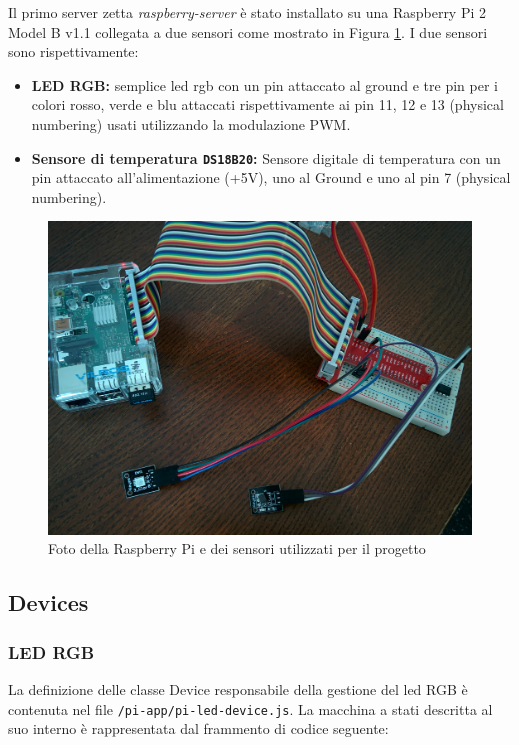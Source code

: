 \documentclass[]{scrartcl}
\begin{document}
Il primo server zetta \textit{raspberry-server} è stato installato su una Raspberry Pi 2 Model B v1.1 collegata a due sensori come mostrato in Figura \ref{fig:circuit}. I due sensori sono rispettivamente:
\begin{itemize}
\item \textbf{LED RGB:} semplice led rgb con un pin attaccato al ground e tre pin per i colori rosso, verde e blu attaccati rispettivamente ai pin 11, 12 e 13 (physical numbering) usati utilizzando la modulazione PWM.
\item \textbf{Sensore di temperatura \texttt{DS18B20}:} Sensore digitale di temperatura con un pin attaccato all'alimentazione (+5V), uno al Ground e uno al pin 7 (physical numbering).
\end{itemize}

\begin{figure}
\centering
\includegraphics[scale=0.1]{circuit.jpg}
\caption{Foto della Raspberry Pi e dei sensori utilizzati per il progetto}
\label{fig:circuit}
\end{figure}

\subsection{Devices}

\subsubsection{LED RGB}
La definizione delle classe Device responsabile della gestione del led RGB è contenuta nel file \texttt{/pi-app/pi-led-device.js}. La macchina a stati descritta al suo interno è rappresentata dal frammento di codice seguente:
\end{document}
